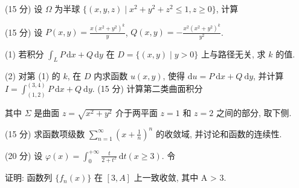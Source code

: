 (15 分) 设 $\Omega$ 为半球 $\{(x, y, z) \mid x^2 + y^2 + z^2 \leq 1, z \geq 0\}$, 计算\par
\nopagebreak[4]
\par{}
(15 分) 设 $P(x, y) = \frac{x(x^2 + y^2)^k}{y}$, $Q(x, y) = -\frac{x^2(x^2 + y^2)^k}{y^2}$.\par
(1) 若积分 $\int_{L} P \, \mathrm{d}x + Q \, \mathrm{d}y$ 在 $D = \{(x, y) \mid y > 0\}$ 上与路径无关, 求 $k$ 的值.\par
\par{}
(2) 对第 (1) 的 $k$, 在 $D$ 内求函数 $u(x, y)$, 使得 $\mathrm{d}u = P \mathrm{~d}x + Q \mathrm{~d}y$, 并计算 $I = \int_{(1,2)}^{(3,4)} P \mathrm{~d}x + Q \mathrm{~d}y$.
(15 分) 计算第二类曲面积分\par
\nopagebreak[4]
其中 $\Sigma$ 是曲面 $z = \sqrt{x^2 + y^2}$ 介于两平面 $z = 1$ 和 $z = 2$ 之间的部分, 取下侧.\par
\par{}
(15 分) 求函数项级数 $\sum_{n=1}^{\infty}\left(x + \frac{1}{n}\right)^n$ 的收敛域, 并讨论和函数的连续性.\par
\par{}
\par{}
(20 分) 设 $\varphi(x) = \int_{0}^{+\infty} \frac{t}{2 + t^x} \, \mathrm{d}t (x \geq 3)$. 令\par
\nopagebreak[4]
证明: 函数列  $\{f_{n}(x)\}$  在  $[3, A]$  上一致收敛, 其中 A > 3.\par
